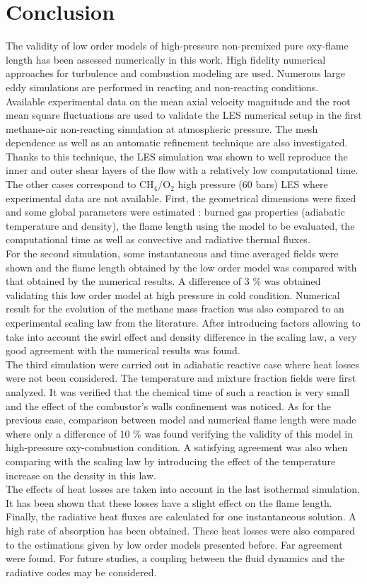 \documentclass[twocolumn,10pt]{asme2e}
\begin{document}
\section*{Conclusion}
The validity of low order models of high-pressure non-premixed pure oxy-flame length has been assessed numerically in this work. High fidelity numerical approaches for turbulence and combustion modeling are used. Numerous large eddy simulations are performed in reacting and non-reacting conditions. \\
Available experimental data on the mean axial velocity magnitude and the root mean square fluctuations are used to validate the LES numerical setup in the first methane-air non-reacting simulation at atmospheric pressure. The mesh dependence as well as an automatic refinement technique are also investigated. Thanks to this technique, the LES simulation was shown to well reproduce the inner and outer shear layers of the flow with a relatively low computational time. \\
The other cases correspond to CH$_4$/O$_2$ high pressure (60 bars) LES where experimental data are not available. First, the geometrical dimensions were fixed and some global parameters were estimated : burned gas properties (adiabatic temperature and density), the flame length using the model to be evaluated, the computational time as well as convective and radiative thermal fluxes. \\
For the second simulation, some instantaneous and time averaged fields were shown and the flame length obtained by the low order model was compared with that obtained by the numerical results. A difference of 3 \% was obtained validating this low order model at high pressure in cold condition. Numerical result for the evolution of the methane mass fraction was also compared to an experimental scaling law from the literature. After introducing factors allowing to take into account the swirl effect and density difference in the scaling law, a very good agreement with the numerical results was found. \\
The third simulation were carried out in adiabatic reactive case where heat losses were not been considered. The temperature and mixture fraction fields were first analyzed. It was verified that the chemical time of such a reaction is very small and the effect of the combustor's walls confinement was noticed. As for the previous case, comparison between model and numerical flame length were made where only a difference of 10 \% was found verifying the validity of this model in high-pressure oxy-combustion condition. A satisfying agreement was also when comparing with the scaling law by introducing the effect of the temperature increase on the density in this law. \\
The effects of heat losses are taken into account in the last isothermal simulation. It has been shown that these losses have a slight effect on the flame length. Finally, the radiative heat fluxes are calculated for one instantaneous solution. A high rate of absorption has been obtained. These heat losses were also compared to the estimations given by low order models presented before. Far agreement were found. For future studies, a coupling between the fluid dynamics and the radiative codes may be considered. 


%


\end{document}
